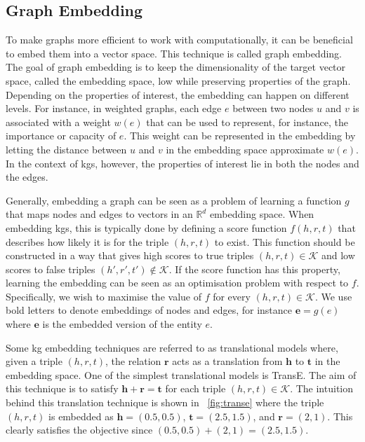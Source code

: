 \subsection{Graph Embedding}\label{sec:embedding}

To make graphs more efficient to work with computationally, it can be beneficial to embed them into a vector space\cite{Cai2018}.
This technique is called graph embedding.
The goal of graph embedding is to keep the dimensionality of the target vector space, called the embedding space, low while preserving properties of the graph.
Depending on the properties of interest, the embedding can happen on different levels.
For instance, in weighted graphs, each edge $e$ between two nodes $u$ and $v$ is associated with a weight $w(e)$ that can be used to represent, for instance, the importance or capacity of $e$.
This weight can be represented in the embedding by letting the distance between $u$ and $v$ in the embedding space approximate $w(e)$.
In the context of \acp{kg}, however, the properties of interest lie in both the nodes and the edges.

Generally, embedding a graph can be seen as a problem of learning a function $g$ that maps nodes and edges to vectors in an $\mathbb{R}^d$ embedding space.
When embedding \acp{kg}, this is typically done by defining a score function $f(h, r, t)$ that describes how likely it is for the triple $(h, r, t)$ to exist\cite{Sun2019}.
This function should be constructed in a way that gives high scores to true triples $(h, r, t) \in \mathcal{K}$ and low scores to false triples $(h', r', t') \not\in \mathcal{K}$.
If the score function has this property, learning the embedding can be seen as an optimisation problem with respect to $f$.
Specifically, we wish to maximise the value of $f$ for every $(h, r, t) \in \mathcal{K}$.
We use bold letters to denote embeddings of nodes and edges, for instance $\bm{e} = g(e)$ where $\bm{e}$ is the embedded version of the entity $e$.

Some \ac{kg} embedding techniques are referred to as translational models where, given a triple $(h, r, t)$, the relation $\bm{r}$ acts as a translation from $\bm{h}$ to $\bm{t}$ in the embedding space.
One of the simplest translational models is TransE\cite{Bordes2013}.
The aim of this technique is to satisfy $\bm{h} + \bm{r} = \bm{t}$ for each triple $(h, r, t) \in \mathcal{K}$.
The intuition behind this translation technique is shown in \figurename~\ref{fig:transe} where the triple $(h, r, t)$ is embedded as $\bm{h} = (0.5, 0.5)$, $\bm{t} = (2.5, 1.5)$, and $\bm{r} = (2, 1)$.
This clearly satisfies the objective since $(0.5, 0.5) + (2, 1) = (2.5, 1.5)$.

